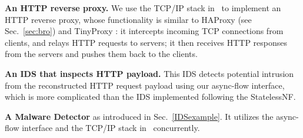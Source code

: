 \vspace{1mm}
\noindent\textbf{An HTTP reverse proxy.} We use the TCP/IP stack in \netstar~to implement an HTTP reverse proxy, whose functionality is similar to HAProxy (see Sec.~\ref{sec:bro}) and TinyProxy \cite{}: %
it intercepts incoming TCP connections from clients, and relays HTTP requests to servers; it then receives HTTP responses from the servers and pushes them back to the clients. %

\vspace{1mm}
\noindent\textbf{An IDS that inspects HTTP payload.} This IDS detects potential intrusion from the reconstructed HTTP request payload using our async-flow interface, which is more complicated than the IDS implemented following the StatelessNF. %



\vspace{1mm}
\noindent\textbf{A Malware Detector} as introduced in Sec.~\ref{IDSexample}. %
 It utilizes the async-flow interface and the TCP/IP stack in \netstar~concurrently. %
